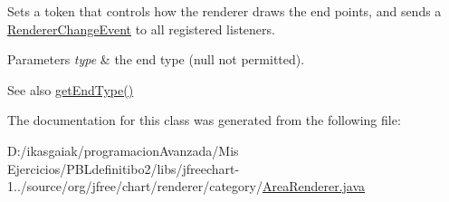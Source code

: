 Sets a token that controls how the renderer draws the end points, and sends a \mbox{\hyperlink{}{Renderer\+Change\+Event}} to all registered listeners.


\begin{DoxyParams}{Parameters}
{\em type} & the end type ({\ttfamily null} not permitted).\\
\hline
\end{DoxyParams}
\begin{DoxySeeAlso}{See also}
\mbox{\hyperlink{classorg_1_1jfree_1_1chart_1_1renderer_1_1category_1_1_area_renderer_ab2696ac02805a7c75d191a5731d821fe}{get\+End\+Type()}} 
\end{DoxySeeAlso}


The documentation for this class was generated from the following file\+:\begin{DoxyCompactItemize}
\item 
D\+:/ikasgaiak/programacion\+Avanzada/\+Mis Ejercicios/\+P\+B\+Ldefinitibo2/libs/jfreechart-\/1../source/org/jfree/chart/renderer/category/\mbox{\hyperlink{_area_renderer_8java}{Area\+Renderer.\+java}}\end{DoxyCompactItemize}
